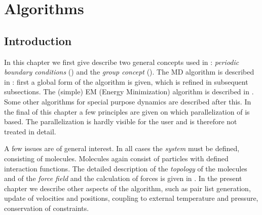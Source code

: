 %
% 
% 
% 
% 
% 
% 
% 
% 
%

\newcommand{\nproc}{\mbox{$M$}}
\newcommand{\natom}{\mbox{$N$}}
\newcommand{\nx}{\mbox{$n_x$}}
\newcommand{\ny}{\mbox{$n_y$}}
\newcommand{\nz}{\mbox{$n_z$}}
\newcommand{\nsgrid}{NS grid}
\newcommand{\fftgrid}{FFT grid}
\newcommand{\dgrid}{\mbox{$\delta_{grid}$}}
\chapter{Algorithms}
\label{ch:algorithms}
\section{Introduction}
In this chapter we first give describe two general concepts used in
{\gromacs}:  {\em periodic boundary conditions} ()
and the {\em group concept} (). The MD algorithm is
described in : first a global form of the algorithm is
given, which is refined in subsequent subsections. The (simple) EM
(Energy Minimization) algorithm is described in . Some
other algorithms for special purpose dynamics are described after
this.  In the final  of this chapter a few principles are
given on which parallelization of {\gromacs} is based. The
parallelization is hardly visible for the user and is therefore not
treated in detail.

A few issues are of general interest. In all cases the {\em system}
must be defined, consisting of molecules. Molecules again consist of
particles  with defined interaction functions. The detailed
description of the {\em topology} of the molecules and of the {\em force
field} and the calculation of forces is given in
. In the present chapter we describe
other aspects of the algorithm, such as pair list generation, update of
velocities  and positions, coupling to external temperature and
pressure,  conservation of constraints. 

